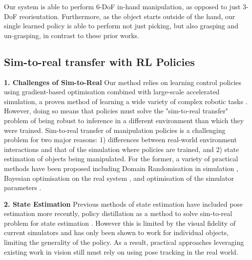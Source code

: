 \documentclass[letterpaper, 10 pt, conference]{ieeeconf}  %
\begin{document}
Our system is able to perform 6-DoF in-hand manipulation, as opposed to just 3-DoF reorientation. Furthermore, as the object starts outside of the hand, our single learned policy is able to perform not just picking, but also grasping and un-grasping, in contrast to these prior works.

\vspace{-3pt}
\subsection{Sim-to-real transfer with RL Policies}
\vspace{-3pt}

\noindent \textbf{1. Challenges of Sim-to-Real} Our method relies on learning control policies using gradient-based optimisation combined with large-scale accelerated simulation, a proven method of learning a wide variety of complex robotic tasks \citep{makoviychuk2021isaac, brax2021github, mandlekar2017arpl, Jason:ICRA:2018}. However, doing so means that policies must solve the "sim-to-real transfer" problem of being robust to inference in a different environment than which they were trained. Sim-to-real transfer of manipulation policies is a challenging problem for two major reasons: 1) differences between real-world environment interactions and that of the simulation where policies are trained, and 2) state estimation of objects being manipulated. For the former, a variety of practical methods have been proposed including Domain Randomisation in simulation \citep{Jason:ICRA:2018, mandlekar2017arpl}, Bayesian optimisation on the real system \citep{trifinger-benchmarking}, and optimisation of the simulator parameters \citep{chebotar2019closing, bayessim}.

\noindent \textbf{2. State Estimation} Previous methods of state estimation have included pose estimation \citep{openai-sh, tremblay2018deep} more recently, policy distillation as a method to solve sim-to-real problem for state estimation \citep{chen21, Hwangbo_2019}. However this is limited by the visual fidelity of current simulators and has only been shown to work for individual objects, limiting the generality of the policy. As a result, practical approaches leveraging existing work in vision still must rely on using pose tracking in the real world.
\end{document}
